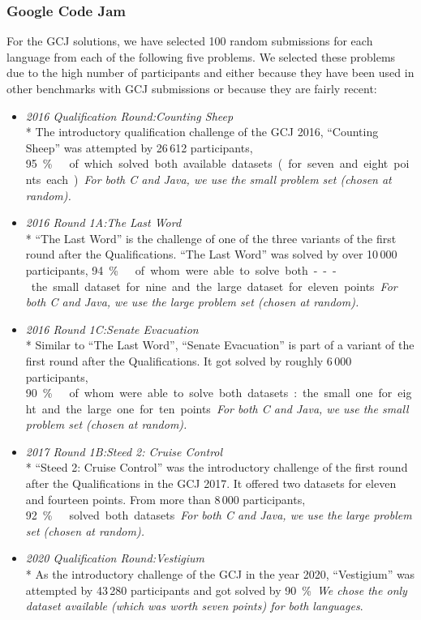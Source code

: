 \documentclass[10pt,journal,compsoc]{IEEEtran}
\begin{document}
\subsubsection{Google Code Jam}
For the GCJ solutions, we have selected 100 random submissions for each language from each of the following five problems. We selected these problems due to the high number of participants and either because they have been used in other benchmarks with GCJ submissions or because they are fairly recent:
\begin{itemize}
  \item \textsl{2016 Qualification Round:\quad Counting Sheep}\\*
  The introductory qualification challenge of the GCJ 2016, \enquote{Counting Sheep} was attempted by 26\,612 participants, \qty{95}\percent\ of which solved both available datasets (for seven and eight points each).
  \textit{For both C and Java, we use the small problem set (chosen at random).}
  \item \textsl{2016 Round 1A:\quad The Last Word}\\*
  \enquote{The Last Word} is the challenge of one of the three variants of the first round after the Qualifications. \enquote{The Last Word} was solved by over 10\,000 participants, \qty{94}\percent\ of whom were able to solve both---the small dataset for nine and the large dataset for eleven points.
  \textit{For both C and Java, we use the large problem set (chosen at random).}
  \item \textsl{2016 Round 1C:\quad Senate Evacuation}\\*
  Similar to \enquote{The Last Word}, \enquote{Senate Evacuation} is part of a variant of the first round after the Qualifications. It got solved by roughly 6\,000 participants, \qty{90}\percent\ of whom were able to solve both datasets: the small one for eight and the large one for ten points.
  \textit{For both C and Java, we use the small problem set (chosen at random).}
  \item \textsl{2017 Round 1B:\quad Steed 2: Cruise Control}\\*
  \enquote{Steed 2: Cruise Control} was the introductory challenge of the first round after the Qualifications in the GCJ 2017. It offered two datasets for eleven and fourteen points. From more than 8\,000 participants, \qty{92}\percent\ solved both datasets.
  \textit{For both C and Java, we use the large problem set (chosen at random).}
  \item \textsl{2020 Qualification Round:\quad Vestigium}\\*
  As the introductory challenge of the GCJ in the year 2020, \enquote{Vestigium} was attempted by 43\,280 participants and got solved by \qty{90}\percent.
  \textsl{We chose the only dataset available (which was worth seven points) for both languages}.
\end{itemize}
\end{document}

